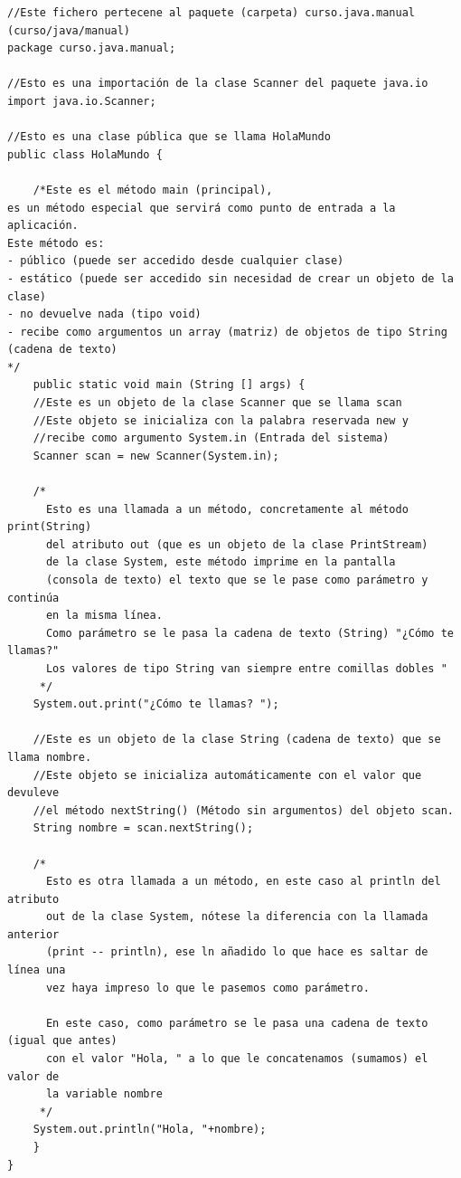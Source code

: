 \documentclass[11pt]{article}
\begin{document}
\begin{verbatim}
//Este fichero pertecene al paquete (carpeta) curso.java.manual (curso/java/manual)
package curso.java.manual;

//Esto es una importación de la clase Scanner del paquete java.io
import java.io.Scanner;

//Esto es una clase pública que se llama HolaMundo
public class HolaMundo {

    /*Este es el método main (principal), 
es un método especial que servirá como punto de entrada a la aplicación. 
Este método es:
- público (puede ser accedido desde cualquier clase)
- estático (puede ser accedido sin necesidad de crear un objeto de la clase)
- no devuelve nada (tipo void)
- recibe como argumentos un array (matriz) de objetos de tipo String (cadena de texto)
*/
    public static void main (String [] args) {
	//Este es un objeto de la clase Scanner que se llama scan
	//Este objeto se inicializa con la palabra reservada new y
	//recibe como argumento System.in (Entrada del sistema)
	Scanner scan = new Scanner(System.in);

	/*
	  Esto es una llamada a un método, concretamente al método print(String)
	  del atributo out (que es un objeto de la clase PrintStream) 
	  de la clase System, este método imprime en la pantalla
	  (consola de texto) el texto que se le pase como parámetro y continúa
	  en la misma línea.
	  Como parámetro se le pasa la cadena de texto (String) "¿Cómo te llamas?"
	  Los valores de tipo String van siempre entre comillas dobles "
	 */
	System.out.print("¿Cómo te llamas? ");

	//Este es un objeto de la clase String (cadena de texto) que se llama nombre.
	//Este objeto se inicializa automáticamente con el valor que devuleve
	//el método nextString() (Método sin argumentos) del objeto scan.
	String nombre = scan.nextString();

	/*
	  Esto es otra llamada a un método, en este caso al println del atributo
	  out de la clase System, nótese la diferencia con la llamada anterior
	  (print -- println), ese ln añadido lo que hace es saltar de línea una
	  vez haya impreso lo que le pasemos como parámetro.

	  En este caso, como parámetro se le pasa una cadena de texto (igual que antes)
	  con el valor "Hola, " a lo que le concatenamos (sumamos) el valor de 
	  la variable nombre
	 */
	System.out.println("Hola, "+nombre);
    }
}
\end{verbatim}
\end{document}
